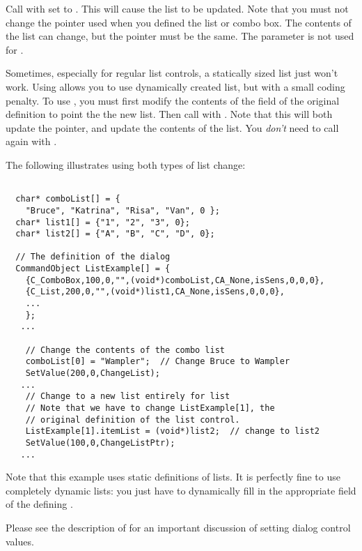 Call  with  set to .
This will cause the list to be updated. Note that you must not
change the  pointer used when you defined the list
or combo box. The contents of the list can change, but the
pointer must be the same. The  parameter is not used
for . 

Sometimes, especially for regular list controls, a statically
sized list just won't work. Using  allows
you to use dynamically created list, but with a small coding
penalty. To use , you must first modify
the contents of the  field of the original 
 definition to point the the new list.
Then call  with . Note
that this will both update the pointer, and update the
contents of the list. You \emph{don't} need to call again with
.

The following illustrates using both types of list change:

\footnotesize
\begin{verbatim}

  char* comboList[] = {
    "Bruce", "Katrina", "Risa", "Van", 0 };
  char* list1[] = {"1", "2", "3", 0};
  char* list2[] = {"A", "B", "C", "D", 0};

  // The definition of the dialog
  CommandObject ListExample[] = {
    {C_ComboBox,100,0,"",(void*)comboList,CA_None,isSens,0,0,0},
    {C_List,200,0,"",(void*)list1,CA_None,isSens,0,0,0},
    ...
    };
   ...

    // Change the contents of the combo list
    comboList[0] = "Wampler";  // Change Bruce to Wampler
    SetValue(200,0,ChangeList);
   ...
    // Change to a new list entirely for list
    // Note that we have to change ListExample[1], the
    // original definition of the list control.
    ListExample[1].itemList = (void*)list2;  // change to list2
    SetValue(100,0,ChangeListPtr);
   ...
\end{verbatim}
\normalfont\normalsize

Note that this example uses static definitions of lists. It is
perfectly fine to use completely dynamic lists: you just have
to dynamically fill in the appropriate  field
of the defining .

Please see the description of 
for an important discussion of setting dialog control values.


